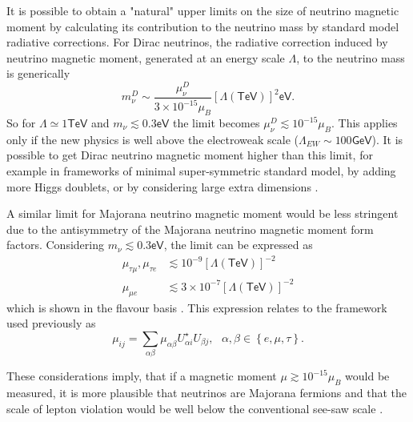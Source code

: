 It is possible \cite{nuMMMajoranaBounds2006.pdf} to obtain a "natural" upper limits on the size of neutrino magnetic moment by calculating its contribution to the neutrino mass by standard model radiative corrections. For Dirac neutrinos, the radiative correction induced by neutrino magnetic moment, generated at an energy scale $\Lambda$, to the neutrino mass is generically
\begin{equation}
m_{\nu}^D\sim\frac{\mu_{\nu}^D}{3\times 10^{-15}\mu_B}\left[\Lambda\left(\textsf{TeV}\right)\right]^2\textsf{eV}.
\end{equation}
So for $\Lambda\simeq 1\textsf{TeV}$  and $m_{\nu}\lesssim 0.3\textsf{eV}$ the limit becomes $\mu_{\nu}^D\lesssim 10^{-15}\mu_B$. This applies only if the new physics is well above the electroweak scale ($\Lambda_{EW} \sim 100\textsf{GeV}$). It is possible to get Dirac neutrino magnetic moment higher than this limit, for example in frameworks of minimal super-symmetric standard model, by adding more Higgs doublets, or by considering large extra dimensions \cite{nuElmagInt2015.pdf}.

A similar limit for Majorana neutrino magnetic moment would be less stringent due to the antisymmetry of the Majorana neutrino magnetic moment form factors. Considering $m_{\nu}\lesssim 0.3\textsf{eV}$, the limit can be expressed as 
\begin{align}
\mu_{\tau\mu},\mu_{\tau e} &\lesssim 10^{-9}\left[\Lambda\left(\textsf{TeV}\right)\right]^{-2}\\
\mu_{\mu e} &\lesssim 3\times 10^{-7}\left[\Lambda\left(\textsf{TeV}\right)\right]^{-2}
\end{align}
which is shown in the flavour basis \cite{nuMMMajoranaBounds2006.pdf}. This expression relates to the framework used previously as
\begin{equation}
\mu_{ij}=\sum_{\alpha\beta}\mu_{\alpha\beta}U^{\star}_{\alpha i}U_{\beta j},\ \ \ \alpha,\beta\in\left\lbrace e,\mu,\tau\right\rbrace.
\end{equation}

These considerations imply, that if a magnetic moment $\mu\gtrsim 10^{-15}\mu_B$ would be measured, it is more plausible that neutrinos are Majorana fermions and that the scale of lepton violation would be well below the conventional see-saw scale \cite{nuMMMajoranaBounds2006.pdf} .

